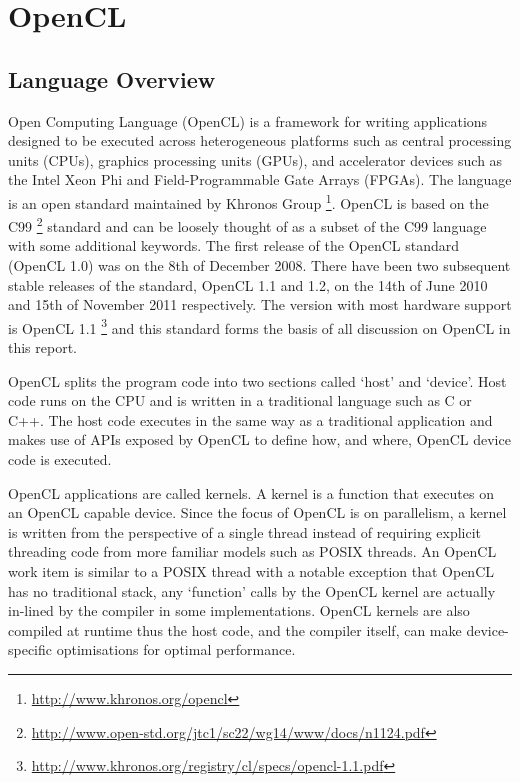 \section{OpenCL}

\subsection{Language Overview}

Open Computing Language (OpenCL) is a framework for writing applications
designed to be executed across heterogeneous platforms such as central
processing units (CPUs), graphics processing units (GPUs), and accelerator
devices such as the Intel Xeon Phi and Field-Programmable Gate Arrays (FPGAs).
The language is an open standard maintained by Khronos Group
\footnote{\url{http://www.khronos.org/opencl}}. OpenCL is based on the C99
\footnote{\url{http://www.open-std.org/jtc1/sc22/wg14/www/docs/n1124.pdf}}
standard and can be loosely thought of as a subset of the C99 language with some
additional keywords. The first release of the OpenCL standard (OpenCL 1.0) was
on the 8th of December 2008. There have been two subsequent stable releases of
the standard, OpenCL 1.1 and 1.2, on the 14th of June 2010 and 15th of November
2011 respectively. The version with most hardware support is OpenCL 1.1
\footnote{\url{http://www.khronos.org/registry/cl/specs/opencl-1.1.pdf}} and
this standard forms the basis of all discussion on OpenCL in this report.

OpenCL splits the program code into two sections called `host' and `device'.
Host code runs on the CPU and is written in a traditional language such as C or
C++. The host code executes in the same way as a traditional application and
makes use of APIs exposed by OpenCL to define how, and where, OpenCL device code
is executed.

OpenCL applications are called kernels. A kernel is a function that executes on
an OpenCL capable device. Since the focus of OpenCL is on parallelism, a kernel
is written from the perspective of a single thread instead of requiring explicit
threading code from more familiar models such as POSIX threads. An OpenCL work
item is similar to a POSIX thread with a notable exception that OpenCL has no
traditional stack, any `function' calls by the OpenCL kernel are actually
in-lined by the compiler in some implementations. OpenCL kernels are also
compiled at runtime thus the host code, and the compiler itself, can make
device-specific optimisations for optimal performance.

